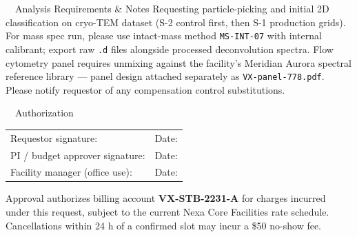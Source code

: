 \documentclass[10pt,a4paper]{article}
\newcommand{\fillline}[1]{\leavevmode\hrulefill\hspace{2pt}\textcolor{coregray}{\scriptsize #1}}
\begin{document}
\vspace{0pt}

\begin{secbox}{\faFile\ \ Analysis Requirements \& Notes}
\small
Requesting particle-picking and initial 2D classification on cryo-TEM dataset (S-2 control first, then S-1
production grids). For mass spec run, please use intact-mass method \texttt{MS-INT-07} with internal calibrant;
export raw \texttt{.d} files alongside processed deconvolution spectra. Flow cytometry panel requires unmixing
against the facility's Meridian Aurora spectral reference library --- panel design attached separately as
\texttt{VX-panel-778.pdf}. Please notify requestor of any compensation control substitutions.
\end{secbox}

\vspace{0pt}

\begin{secbox}{\faPen\ \ Authorization}
\begin{tabularx}{\linewidth}{@{}Y Y@{}}
Requestor signature: \fillline{} & Date: \fillline{}\\[6pt]
PI / budget approver signature: \fillline{} & Date: \fillline{}\\[6pt]
Facility manager (office use): \fillline{} & Date: \fillline{}\\
\end{tabularx}

\vspace{6pt}
{\scriptsize\color{coregray} Approval authorizes billing account \textbf{VX-STB-2231-A} for charges incurred under this
request, subject to the current Nexa Core Facilities rate schedule. Cancellations within 24 h of a confirmed
slot may incur a \$50 no-show fee.}
\end{secbox}
\end{document}
